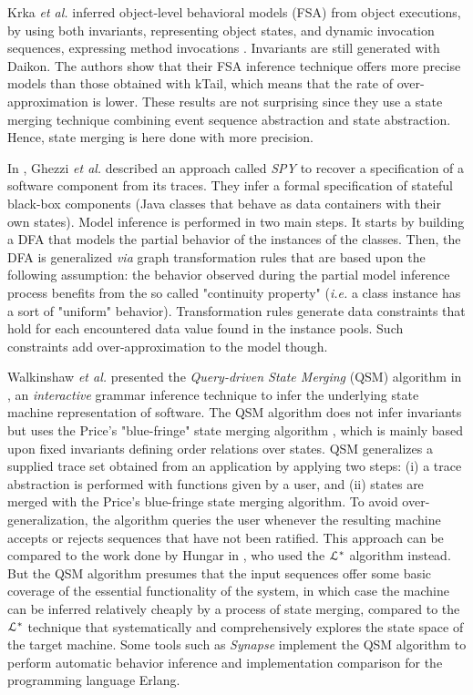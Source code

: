 Krka \emph{et al.} inferred object-level behavioral models (FSA) from
object executions, by using both invariants, representing object
states, and dynamic invocation sequences, expressing method
invocations \cite{Krka:2010:UDE:1810295.1810324}.
Invariants are still generated with Daikon. The authors show that
their FSA inference technique offers more precise models than
those obtained with kTail, which means that the rate of
over-approximation is lower. These results are not surprising
since they use a state merging technique combining event sequence
abstraction and state abstraction. Hence, state merging is here
done with more precision.

In \cite{Ghezzi:2009:SIB:1555001.1555057}, Ghezzi \emph{et al.}
described an approach called \textit{SPY} to recover a
specification of a software component from its traces. They infer
a formal specification of stateful black-box components (Java
classes that behave as data containers with their own states).
Model inference is performed in two main steps. It starts by
building a DFA that models the partial behavior of the instances
of the classes. Then, the DFA is generalized \emph{via} graph
transformation rules that are based upon the following
assumption: the behavior observed during the partial model
inference process benefits from the so called "continuity
property" (\emph{i.e.} a class instance has a sort of "uniform"
behavior). Transformation rules generate data constraints that
hold for each encountered data value found in the instance pools.
Such constraints add over-approximation to the model though.

Walkinshaw \emph{et al.} presented the \textit{Query-driven State
Merging} (QSM) algorithm in
\cite{Walkinshaw07reverseengineering}, an \textit{interactive}
grammar inference technique to infer the underlying state machine
representation of software. The QSM algorithm does not infer
invariants but uses the Price's "blue-fringe" state merging
algorithm \cite{Lang:1998:RAO:645517.655780}, which is mainly
based upon fixed invariants defining order relations over states.
QSM generalizes a supplied trace set obtained from an application
by applying two steps: (i) a trace abstraction is performed
with functions given by a user, and (ii) states are merged with
the Price's blue-fringe state merging algorithm. To avoid
over-generalization, the algorithm queries the user whenever the
resulting machine accepts or rejects sequences that have not
been ratified. This approach can be compared to the work done by
Hungar in \cite{hungar}, who used the $\EuScript{L}^*$ algorithm
instead. But the QSM algorithm presumes that the input sequences
offer some basic coverage of the essential functionality of the
system, in which case the machine can be inferred relatively
cheaply by a process of state merging, compared to the
$\EuScript{L}^*$ technique that systematically and
comprehensively explores the state space of the target machine.
Some tools such as \textit{Synapse}
\cite{LamelaSeijas:2014:SAB:2633448.2633457} implement the QSM
algorithm to perform automatic behavior inference and
implementation comparison for the programming language Erlang.

